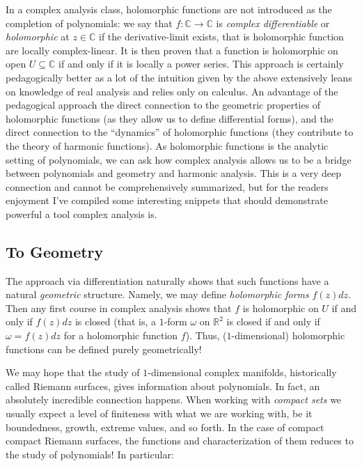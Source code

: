 \documentclass[oneside]{article}
\newcommand{\C}{\mathbb{C}}
\newcommand{\R}{\mathbb{R}}
\newcommand{\sse}{\subseteq}
\begin{document}
In a complex analysis class, holomorphic functions are not introduced as the completion of polynomials: we say
that $f: \C \to \C$ is \emph{complex differentiable} or \emph{holomorphic} at $z \in \C$ if the
derivative-limit exists, that is holomorphic function are locally complex-linear. It is then
proven that a function is holomorphic on open $U \sse \C$ if and only if it is locally a power series. This
approach is certainly pedagogically better as a lot of the intuition given by the above extensively leans on
knowledge of real analysis and relies only on calculus. An advantage of the pedagogical approach the direct
connection to the geometric properties of holomorphic functions (as they allow us to define differential forms),
and the direct connection to the ``dynamics'' of holomorphic functions (they contribute to the theory of
harmonic functions). As holomorphic functions is the analytic setting of polynomials, we can ask how complex
analysis allows us to be a bridge between polynomials and geometry and harmonic analysis. This is a very deep
connection and cannot be comprehensively summarized, but for the readers enjoyment I've compiled some
interesting snippets that should demonstrate powerful a tool complex analysis is.


\subsection{To Geometry}



The approach via differentiation naturally shows that such functions have a
natural \emph{geometric} structure. Namely, we may define \emph{holomorphic forms} $f(z)dz$. Then any first
course in complex analysis shows that $f$ is holomorphic on $U$ if and only if $f(z)dz$ is closed (that is, a
$1$-form $\omega$ on $\R^2$ is closed if and only if $\omega = f(z)dz$ for a holomorphic function $f$). Thus,
($1$-dimensional) holomorphic functions can be defined purely geometrically!

We may hope that the study of $1$-dimensional complex manifolds, historically called Riemann surfaces, gives information
about polynomials. In fact, an absolutely incredible connection happens. When working with
\emph{compact sets} we usually expect a level of finiteness with what we are working with, be it boundedness,
growth, extreme values, and so forth. In the case of compact compact Riemann surfaces, the functions and
characterization of them reduces to the study of polynomials! In particular:
\end{document}

